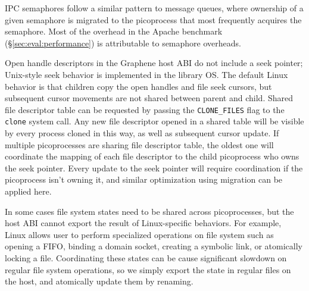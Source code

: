 
\vspace{5pt}
 IPC semaphores 
follow a similar pattern to message queues, where ownership of a given semaphore is migrated
to the picoprocess that most frequently acquires the semaphore.
Most of the overhead in the Apache benchmark (\S\ref{sec:eval:performance}) is attributable to semaphore overheads.

\vspace{5pt}
Open handle descriptors in the Graphene host ABI do not include a seek pointer; 
Unix-style seek behavior is implemented in the library OS.
The default Linux behavior is that children copy the open handles and file seek cursors,
but subsequent cursor movements are not shared between parent and child.
Shared file descriptor table can be requested by passing the {\tt CLONE\_FILES} flag to the {\tt clone} system call.
Any new file descriptor opened in a shared table will be visible by every process cloned in this way, as well as subsequent cursor update.
If multiple picoprocesses are sharing file descriptor table,
the oldest one will coordinate the mapping of each file descriptor to the child picoprocess who owns the seek pointer.
Every update to the seek pointer will require coordination
if the picoprocess isn't owning it,
and similar optimization using migration can be applied here. 

\vspace{5pt}
In some cases file system states need to be shared across picoprocesses,
but the host ABI cannot export the result of Linux-specific behaviors.
For example, Linux allows user to perform specialized operations on file system
such as opening a FIFO, binding a domain socket, creating a symbolic link,
or atomically locking a file.
Coordinating these states can be cause significant slowdown on regular file system operations, so we simply export the state in regular files on the host,
 and atomically update them by renaming.

